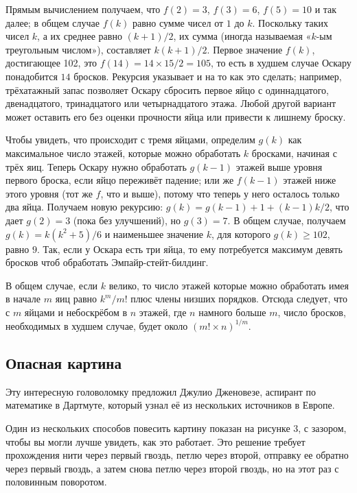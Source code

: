 Прямым вычислением получаем, что $f(2) = 3$, $f(3) = 6$, $f(5) = 10$ и так далее; в общем случае $f(k)$ равно сумме чисел от $1$ до $k$.
Поскольку таких чисел $k$, а их среднее равно $(k + 1)/2$, их сумма (иногда называемая «$k$-ым треугольным числом»), составляет $k(k + 1)/2$.
Первое значение $f(k)$, достигающее 102, это $f(14) = 14 \times 15/2 = 105$, то есть в худшем случае Оскару понадобится $14$ бросков.
Рекурсия указывает и на то как это сделать;
например, трёхатажный запас позволяет Оскару сбросить первое яйцо с одиннадцатого, двенадцатого, тринадцатого или четырнадцатого этажа.
Любой другой вариант может оставить его без оценки прочности яйца или привести к лишнему броску.

Чтобы увидеть, что происходит с тремя яйцами, определим $g(k)$ как максимальное число этажей, которые можно обработать $k$ бросками, начиная с трёх яиц.
Теперь Оскару нужно обработать $g(k - 1)$ этажей выше уровня первого броска, если яйцо переживёт падение;
или же $f(k - 1)$ этажей ниже этого уровня (тот же $f$, что и выше), потому что теперь у него осталось только два яйца.
Получаем новую рекурсию: $g(k) = g(k-1) + 1 + (k - 1)k/2$, что дает $g(2) = 3$ (пока без улучшений), но $g(3) = 7$.
В общем случае, получаем $g(k)=k(k^2+5)/6$ и наименьшее значение $k$, для которого 
$g(k)\ge 102$, равно $9$.
Так, если у Оскара есть три яйца,
то ему потребуется максимум девять бросков чтоб обработать Эмпайр-стейт-билдинг.

В общем случае, если $k$ велико, то число этажей которые можно обработать имея в начале $m$ яиц равно $k^m/m!$ плюс члены низших порядков.
Отсюда следует, что с $m$ яйцами и небоскрёбом в $n$ этажей, где  $n$ намного больше $m$, число бросков, необходимых в худшем случае, будет около $(m!\times n)^{1/m}$.

\subsection*{Опасная картина}

Эту интересную головоломку предложил Джулио Дженовезе, аспирант по математике в Дартмуте, который узнал её из нескольких источников в Европе.

Один из нескольких способов повесить картину показан на рисунке 3, с зазором, чтобы вы могли лучше увидеть, как это работает.
Это решение требует прохождения нити через первый гвоздь, петлю через второй, отправку ее обратно через первый гвоздь, а затем снова петлю через второй гвоздь, но на этот раз с половинным поворотом.


